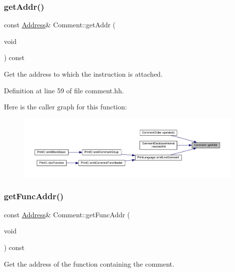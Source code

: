 \subsubsection{\texorpdfstring{getAddr()}{getAddr()}}
{\footnotesize\ttfamily const \mbox{\hyperlink{class_address}{Address}}\& Comment\+::get\+Addr (\begin{DoxyParamCaption}\item[{void}]{ }\end{DoxyParamCaption}) const\hspace{0.3cm}{\ttfamily [inline]}}



Get the address to which the instruction is attached. 



Definition at line 59 of file comment.\+hh.

Here is the caller graph for this function\+:
\nopagebreak
\begin{figure}[H]
\begin{center}
\leavevmode
\includegraphics[width=350pt]{class_comment_abdcb4c6ccdf8d7c9c5652c4d357c0ed6_icgraph}
\end{center}
\end{figure}
\mbox{\label{class_comment_a0eccc5786c949590857ff8ed9e1dadbf}} 
\subsubsection{\texorpdfstring{getFuncAddr()}{getFuncAddr()}}
{\footnotesize\ttfamily const \mbox{\hyperlink{class_address}{Address}}\& Comment\+::get\+Func\+Addr (\begin{DoxyParamCaption}\item[{void}]{ }\end{DoxyParamCaption}) const\hspace{0.3cm}{\ttfamily [inline]}}



Get the address of the function containing the comment. 



